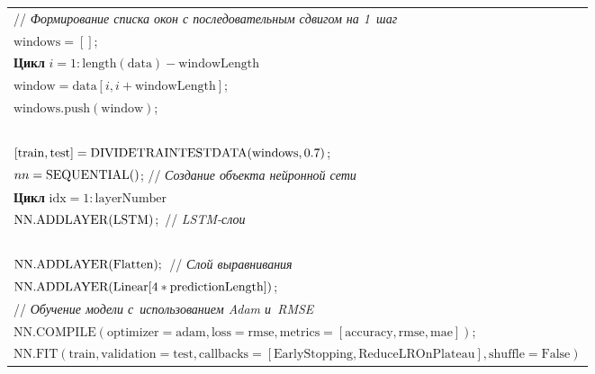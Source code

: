 \begin{multicols}{2}
\begin{figure*}
{\begin{center}
\begin{tabular}{l}
\hspace*{3mm} // \textit{Формирование списка окон с последовательным сдвигом 
на 1~шаг}\\
$\mathrm{windows} = []$;\\
\textbf{Цикл} $i = 1:\mathrm{length(data) - windowLength}$\\
\hspace*{3mm}$\mathrm{window = data}[i, i + \mathrm{windowLength}]$;\\
\hspace*{3mm}$\mathrm{windows.push(window)}$;\\
\ \\
$[\mathrm{train, test}] = \mathrm{DIVIDE\mbox{\normalsize T}RAIN\mbox{\normalsize T}EST\mbox{\normalsize D}ATA (windows, 0.7)}$;\\
$nn = \mathrm{\mbox{\normalsize S}EQUENTIAL}()$;  // \textit{Создание объекта нейронной сети}\\
\textbf{Цикл} $\mathrm{idx = 1:layerNumber}$\\
\hspace{3mm}$\mathrm{NN.ADD\mbox{\normalsize L}AYER}(\mathrm{LSTM})$;\ // \textit{LSTM-слои}\\
\ \\
$\mathrm{NN.ADD\mbox{{\normalsize L}}AYER(Flatten)};$\ // \textit{Слой выравнивания}\\
$\mathrm{NN.ADD\mbox{\normalsize L}AYER(Linear[4 * predictionLength])}$;\\
\hspace*{5mm}// \textit{Обучение модели с~использованием Adam и~RMSE}\\
$\mathrm{NN.COMPILE(optimizer=adam, loss=rmse, metrics=[accuracy, rmse, mae])}$;\\
$\mathrm{NN.FIT(train,  validation=test, 
callbacks=[EarlyStopping, ReduceLROnPlateau],  shuffle=False)}$\\
\hline
\end{tabular}
\end{center}}
\vspace*{-6pt}
\end{figure*}

\renewcommand{\figurename}{\protect\bf Рис.}


\end{multicols}
